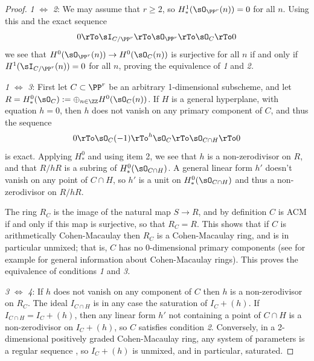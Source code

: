 \begin{proof}
{\sl 1} $\Leftrightarrow$ {\sl 2}: We may assume that $r\geq 2$, so $H^1_*(\sO_{\PP^r}(n)) = 0$ for all $n$. Using this and the exact sequence 
$$
0\rTo \sI_{C/\PP^r}  \rTo  \sO_{\PP^r}  \rTo  \sO_C  \rTo  0
$$
we see that $H^0(\sO_{\PP^r}(n)) \to H^0(\sO_C(n))$ is surjective for all $n$ if and only if $H^1(\sI_{C/\PP^r}(n)) = 0$ for all $n$,
proving the equivalence of {\sl 1} and {\sl 2.}

{\sl 1} $\Leftrightarrow$ {\sl 3}: First let $C\subset \PP^r$ be an arbitrary 1-dimensional subscheme,
and let $R =H^0_*(\sO_{C}) := \oplus_{n\in \ZZ} H^0(\sO_{C}(n))$.
If $H$ is a 
general hyperplane, with equation $h=0$, then $h$ does not vanish on any primary component of $C$, and thus the sequence
$$
0\rTo \sO_C(-1) \rTo^{h}\sO_C\rTo \sO_{C\cap H}\rTo 0
$$
is exact. Applying $H^0_*$ and using item 2, we see that $h$ is a non-zerodivisor on $R$, and that $R/hR$ is
a subring of $H^0_*(\sO_{C\cap H})$.  A general linear form $h'$ doesn't vanish on
any point of $C\cap H$, so $h'$ is a unit on $H^0_*(\sO_{C\cap H})$
and thus a non-zerodivisor on $R/hR$. 

The ring $R_C$ is the image of the natural map $S\to R$, and by definition $C$ is ACM if and only if this map is surjective,
so that $R_C = R.$ This shows that if $C$ is arithmetically Cohen-Macaulay then $R_C$ is a Cohen-Macaulay ring,
and is in particular unmixed; that is, $C$ has no 0-dimensional primary components (see for example \cite[Chapter 18]{Eisenbud1995} for general
information about Cohen-Macaulay rings). This proves the equivalence of conditions {\sl 1} and {\sl 3.}


{\sl 3} $\Leftrightarrow$ {\sl 4}: If  $h$ does not vanish on any component of $C$ then $h$ is a non-zerodivisor on $R_C$. The ideal $I_{C\cap H}$ is in any case the saturation of $I_C+(h)$. 
If $I_{C\cap H}=I_C+(h)$, then any linear form $h'$ not containing a point of $C\cap H$ is a non-zerodivisor
on $I_C+(h)$, so $C$ satisfies condition {\sl 2}. Conversely, in a 2-dimensional positively graded Cohen-Macaulay ring, any 
system of parameters is a regular sequence \cite[Section 18.2]{Eisenbud1995}, so $I_C+(h)$ is unmixed, and in particular, saturated.
\end{proof}

